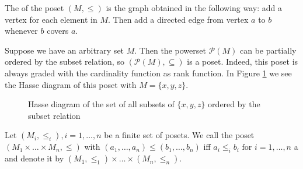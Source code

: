 \begin{defi}
	The  of the poset $(M,\leq)$ is the graph obtained in the following way: add a vertex for each element in $M$. Then add a directed edge from vertex $a$ to $b$ whenever $b$ covers $a$.
\end{defi}

\begin{exam}
	Suppose we have an arbitrary set $M$. Then the powerset $\mathcal P (M)$ can be partially ordered by the subset relation, so $(\mathcal P (M), \subseteq)$ is a poset. Indeed, this poset is always graded with the cardinality function as rank function. In Figure \ref{fig:poset-xyz-subsets} we see the Hasse diagram of this poset with $M = \{x,y,z\}$.

	\begin{figure}[ht]
		\centering
		
		\caption{Hasse diagram of the set of all subsets of $\{x,y,z\}$ ordered by the subset relation}
		\label{fig:poset-xyz-subsets}
	\end{figure}
\end{exam}

\begin{defi}
	Let $(M_i, \leq_i), i = 1,\ldots,n$ be a finite set of posets. We call the poset $(M_1 \times \ldots \times M_n,\leq)$ with $(a_1,\ldots,a_n) \leq (b_1,\ldots,b_n)$ iff $a_i \leq_i b_i \textrm{ for } i=1,\ldots,n$ a  and denote it by $(M_1, \leq_1) \times \ldots \times (M_n, \leq_n)$.
\end{defi}
